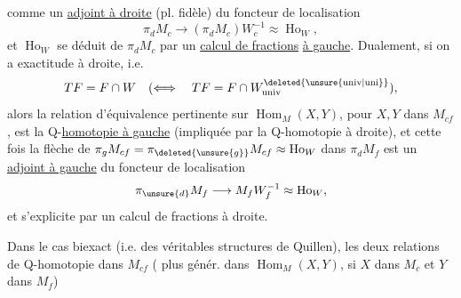 comme un \uline{adjoint à droite} (pl. fidèle) du foncteur de localisation
\[
 \pi_{d}M_{c}\longrightarrow(\pi_{d}M_{c})W_{c}^{-1}\approx\operatorname{Ho}_{W},
\]
et $\operatorname{Ho}_{W}$ se déduit de $\pi_{d}M_{c}$ par un \uline{calcul de fractions} \uline{à gauche}. Dualement, si on a exactitude à droite,  i.e.
\[
 TF=F\cap W\quad(\Longleftrightarrow\quad TF=F\cap W^{\deleted{\unsure{\mathrm{univ}|\mathrm{uni}}}}_{\mathrm{univ}}),
\]
alors la relation d'équivalence pertinente sur $\operatorname{Hom}_{M}(X,Y)$, pour $X,Y$ dans $M_{cf}$, est la Q-\uline{homotopie à gauche} (impliquée par la Q-homotopie à droite), et cette fois la flèche  de $\pi_{g}M_{cf}=\pi_{\deleted{\unsure{g}}}M_{cf}\approx\operatorname{Ho}_{W}$ dans $\pi_{d}M_{f}$
est un \uline{adjoint à gauche}  du foncteur de localisation
\[
 \pi_{\unsure{d}}M_{f}\longrightarrow M_{f}W_{f}^{-1}\approx\operatorname{Ho}_{W},
\]
et   s'explicite par un calcul de fractions à droite. 

Dans le cas biexact (i.e.  des véritables structures de Quillen), les deux relations de Q-homotopie dans $M_{cf}$ ( plus génér. dans  $\operatorname{Hom}_{M}(X,Y)$, si $X$ dans $M_{c}$ et $Y$ dans $M_{f}$)
